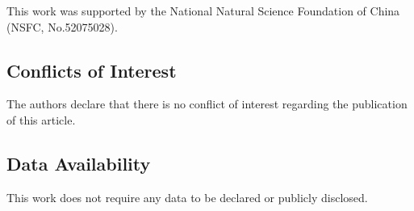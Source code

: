 \documentclass{article}
\begin{document}
This work was supported by the National Natural Science Foundation of China (NSFC, No.52075028).

\subsection*{Conflicts of Interest}

The authors declare that there is no conflict of interest regarding the publication of this article.

\subsection*{Data Availability}

This work does not require any data to be declared or publicly disclosed.

% 
% 
% 
% 
% 
% 
\end{document}
